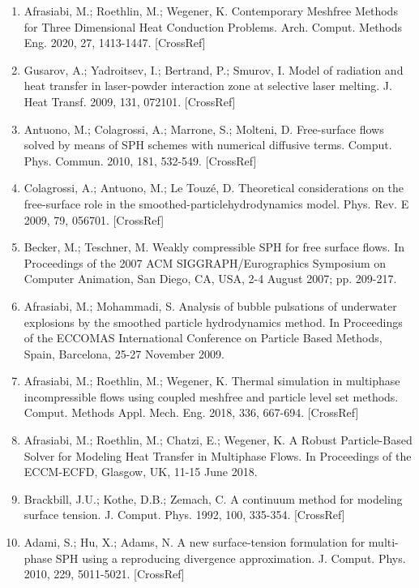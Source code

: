 \documentclass[10pt]{article}
\begin{document}
\begin{enumerate}
  \item Afrasiabi, M.; Roethlin, M.; Wegener, K. Contemporary Meshfree Methods for Three Dimensional Heat Conduction Problems. Arch. Comput. Methods Eng. 2020, 27, 1413-1447. [CrossRef]

  \item Gusarov, A.; Yadroitsev, I.; Bertrand, P.; Smurov, I. Model of radiation and heat transfer in laser-powder interaction zone at selective laser melting. J. Heat Transf. 2009, 131, 072101. [CrossRef]

  \item Antuono, M.; Colagrossi, A.; Marrone, S.; Molteni, D. Free-surface flows solved by means of SPH schemes with numerical diffusive terms. Comput. Phys. Commun. 2010, 181, 532-549. [CrossRef]

  \item Colagrossi, A.; Antuono, M.; Le Touzé, D. Theoretical considerations on the free-surface role in the smoothed-particlehydrodynamics model. Phys. Rev. E 2009, 79, 056701. [CrossRef]

  \item Becker, M.; Teschner, M. Weakly compressible SPH for free surface flows. In Proceedings of the 2007 ACM SIGGRAPH/Eurographics Symposium on Computer Animation, San Diego, CA, USA, 2-4 August 2007; pp. 209-217.

  \item Afrasiabi, M.; Mohammadi, S. Analysis of bubble pulsations of underwater explosions by the smoothed particle hydrodynamics method. In Proceedings of the ECCOMAS International Conference on Particle Based Methods, Spain, Barcelona, 25-27 November 2009.

  \item Afrasiabi, M.; Roethlin, M.; Wegener, K. Thermal simulation in multiphase incompressible flows using coupled meshfree and particle level set methods. Comput. Methods Appl. Mech. Eng. 2018, 336, 667-694. [CrossRef]

  \item Afrasiabi, M.; Roethlin, M.; Chatzi, E.; Wegener, K. A Robust Particle-Based Solver for Modeling Heat Transfer in Multiphase Flows. In Proceedings of the ECCM-ECFD, Glasgow, UK, 11-15 June 2018.

  \item Brackbill, J.U.; Kothe, D.B.; Zemach, C. A continuum method for modeling surface tension. J. Comput. Phys. 1992, 100, 335-354. [CrossRef]

  \item Adami, S.; Hu, X.; Adams, N. A new surface-tension formulation for multi-phase SPH using a reproducing divergence approximation. J. Comput. Phys. 2010, 229, 5011-5021. [CrossRef]


\end{enumerate}
\end{document}
